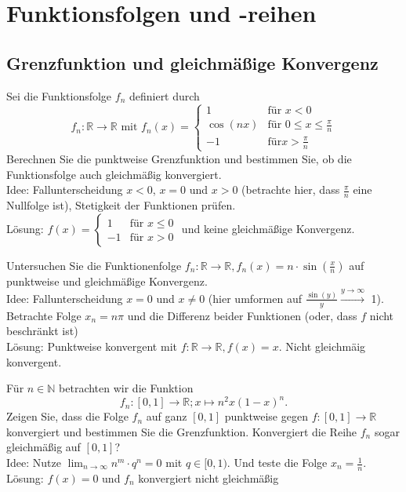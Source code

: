 \section{Funktionsfolgen und -reihen}
\subsection{Grenzfunktion und gleichmäßige Konvergenz}
Sei die Funktionsfolge $f_n$ definiert durch
\begin{displaymath}
  f_n : \mathbb{R} \to \mathbb{R} \text{ mit } f_n(x)=
  \begin{cases}
    1        & \text{für } x < 0\\
    \cos(nx) & \text{für } 0 \leq x \leq \frac{\pi}{n}\\
    -1       &\text{für} x > \frac{\pi}{n} 
  \end{cases}
\end{displaymath}
Berechnen Sie die punktweise Grenzfunktion und bestimmen Sie, ob die Funktionsfolge auch gleichmäßig konvergiert.\\
Idee: Fallunterscheidung $x < 0$, $x = 0$ und $x > 0$ (betrachte hier, dass $\frac{\pi}{n}$ eine Nullfolge ist), Stetigkeit der Funktionen prüfen.\\
Lösung: $f(x) = \begin{cases} 1 & \text{für } x \leq 0\\ -1 & \text{für } x > 0\end{cases}$ und keine gleichmäßige Konvergenz.

Untersuchen Sie die Funktionenfolge $f_n : \mathbb{R} \to \mathbb{R}, f_n(x) = n \cdot \sin\left(\frac{x}{n}\right)$ auf punktweise und gleichmäßige Konvergenz.\\
Idee: Fallunterscheidung $x = 0$ und $x \neq 0$ (hier umformen auf $\frac{\sin(y)}{y} \xrightarrow{y \to \infty}$ 1).
Betrachte Folge $x_n = n\pi$ und die Differenz beider Funktionen (oder, dass $f$ nicht beschränkt ist)\\
Lösung: Punktweise konvergent mit $f : \mathbb{R} \to \mathbb{R}, f(x) = x$. Nicht gleichmäig konvergent.

Für $n \in \mathbb{N}$ betrachten wir die Funktion
\begin{displaymath}
  f_n: [0,1] \to \mathbb{R}; x \mapsto n^2x(1-x)^n.
\end{displaymath}
Zeigen Sie, dass die Folge $f_n$ auf ganz $[0,1]$ punktweise gegen $f : [0,1] \to \mathbb{R}$ konvergiert und bestimmen Sie die Grenzfunktion.
Konvergiert die Reihe $f_n$ sogar gleichmäßig auf $[0,1]$?\\
Idee: Nutze $\lim_{n \to \infty} n^m \cdot q^n = 0$ mit $q \in [0,1)$. Und teste die Folge $x_n = \frac{1}{n}$.\\
Lösung: $f(x) = 0$ und $f_n$ konvergiert nicht gleichmäßig

